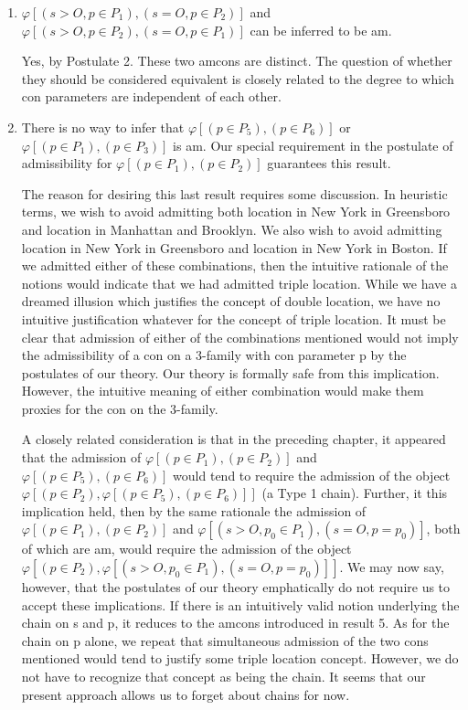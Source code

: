 \documentclass[10pt,twoside,draft]{memoir}
\begin{document}
{{{{\begin{enumerate}
Yes, by Postulate 1. 

\item $\varphi[(s>O, p\in P_1),(s=O, p\in P_2)]$ and $\varphi[(s>O, p\in P_2),(s=O, p\in P_1)]$ can 
be inferred to be am. 

Yes, by Postulate 2. These two amcons are distinct. The question of whether 
they should be considered equivalent is closely related to the degree to 
which con parameters are independent of each other. 

\item There is no way to infer that $\varphi[(p\in P_5),(p\in P_6)]$ or $\varphi[(p\in P_1),(p\in P_3)]$
is am. Our special requirement in the postulate of admissibility for 
$\varphi[(p\in P_1),(p\in P_2)]$ guarantees this result. 

The reason for desiring this last result requires some discussion. In 
heuristic terms, we wish to avoid admitting both location in New York in 
Greensboro and location in Manhattan and Brooklyn. We also wish to avoid 
admitting location in New York in Greensboro and location in New York in 
Boston. If we admitted either of these combinations, then the intuitive 
rationale of the notions would indicate that we had admitted triple location. 
While we have a dreamed illusion which justifies the concept of double 
location, we have no intuitive justification whatever for the concept of triple 
location. It must be clear that admission of either of the combinations 
mentioned would not imply the admissibility of a con on a 3-family with 
con parameter p by the postulates of our theory. Our theory is formally safe 
from this implication. However, the intuitive meaning of either combination 
would make them proxies for the con on the 3-family. 

A closely related consideration is that in the preceding chapter, it 
appeared that the admission of $\varphi[(p\in P_1),(p\in P_2)]$ and $\varphi[(p\in P_5),(p\in P_6)]$
would tend to require the admission of the object $\varphi[(p\in P_2),\varphi[(p\in P_5),(p\in P_6)]]$
(a Type 1 chain). Further, it this implication held, then by the same 
rationale the admission of $\varphi[(p\in P_1),(p\in P_2)]$ and $\varphi[(s>O,p_0\in P_1),(s=O,p=p_0)]$,
		both of which are am, would require the admission of the object 
$\varphi[(p\in P_2), \varphi[(s>O,p_0\in P_1),(s=O, p=p_0)]]$. 
We may now say, however, 
that the postulates of our theory emphatically do not require us to accept 
these implications. If there is an intuitively valid notion underlying the chain 
on s and p, it reduces to the amcons introduced in result 5. As for the chain 
on p alone, we repeat that simultaneous admission of the two cons 
mentioned would tend to justify some triple location concept. However, we 
do not have to recognize that concept as being the chain. It seems that our 
present approach allows us to forget about chains for now. 


\end{enumerate}}}}}
\end{document}
